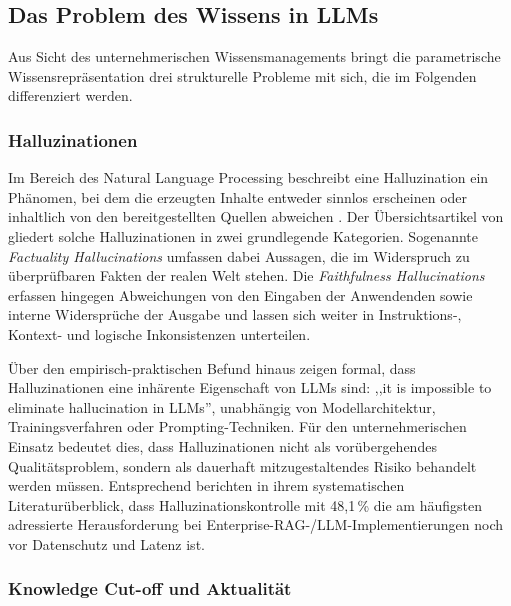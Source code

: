 \subsection{Das Problem des Wissens in LLMs}
\label{sec:wissensproblem}

Aus Sicht des unternehmerischen Wissensmanagements bringt die parametrische 
Wissensrepräsentation drei strukturelle Probleme mit sich, die im Folgenden 
differenziert werden.

\subsubsection{Halluzinationen}
\label{sec:halluzinationen}

Im Bereich des Natural Language Processing beschreibt eine Halluzination ein Phänomen, bei dem die erzeugten Inhalte entweder sinnlos erscheinen oder inhaltlich von den bereitgestellten Quellen abweichen \autocite[1, S. 5]{Huang.2024}. Der Übersichtsartikel von \textcite[1, S. 2]{Huang.2024} gliedert solche Halluzinationen in zwei grundlegende Kategorien. Sogenannte \textit{Factuality Hallucinations} umfassen dabei Aussagen, die im Widerspruch zu überprüfbaren Fakten der realen Welt stehen. Die \textit{Faithfulness Hallucinations} erfassen hingegen Abweichungen von den Eingaben der Anwendenden sowie interne Widersprüche der Ausgabe und lassen sich weiter in Instruktions-, Kontext- und logische Inkonsistenzen unterteilen. 

Über den empirisch-praktischen Befund hinaus zeigen \textcite[1]{Xu.2025} formal, dass Halluzinationen eine inhärente Eigenschaft von LLMs sind: ,,it is impossible to eliminate hallucination in LLMs'', unabhängig von Modellarchitektur, Trainingsverfahren oder Prompting-Techniken. Für den unternehmerischen Einsatz bedeutet dies, dass Halluzinationen nicht als vorübergehendes Qualitätsproblem, sondern als dauerhaft mitzugestaltendes Risiko behandelt werden müssen. Entsprechend berichten \textcite[20]{Karakurt.2026} in ihrem systematischen Literaturüberblick, dass Halluzinationskontrolle mit 48{,}1\,\% die am häufigsten adressierte Herausforderung bei Enterprise-RAG-/LLM-Implementierungen noch vor Datenschutz und Latenz ist.
\subsubsection{Knowledge Cut-off und Aktualität}
\label{sec:cutoff}

